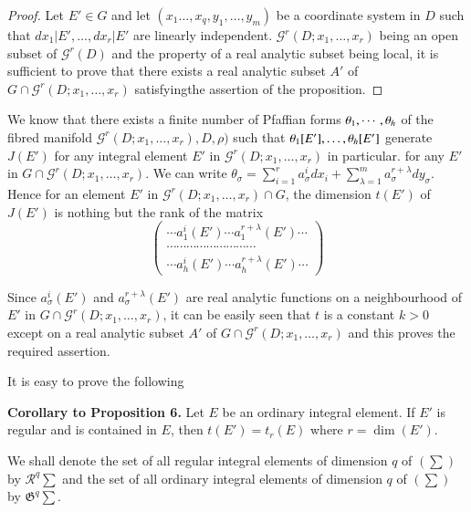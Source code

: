 \begin{proof}
  Let $E' \in G$ and let $(x_1 \ldots ,  x_q,  y_1 ,  \ldots ,  y_m)$
  be a coordinate system in $D$ such that $dx_1 \big | E' ,  \ldots ,
  dx_r \big | E'$ are linearly independent. \break $\mathscr{G}^r (D; x_1,
  \ldots ,  x_r)$ being an open subset of $\mathscr{G}^r(D)$ and the
  property of a real analytic subset being local,  it is sufficient to
  prove that there exists a real analytic subset $A'$ of $G \cap
  \mathscr{G}^r (D; x_1,  \ldots ,  x_r)$ satisfying\pageoriginale the assertion of
  the proposition. 
\end{proof}

We know that there exists a finite number of Pfaffian forms $\theta_1,
\cdots ,\break  \theta _h$ of the fibred manifold $ \mathscr{G}^r (D; x_1,
\ldots ,  x_r),  D,  \rho) $ such that $\theta_1 [E'],  \ldots ,\break
\theta_h  [E']$ generate $J(E')$ for any integral element $E'$ in
$\mathscr{G}^r (D; x_1, \ldots , x_r)$ in particular. for any $E'$ in $G
\cap  \mathscr{G}^r (D; x_1,  \ldots ,  x_r)$. We can write
$\theta_\sigma = \sum\limits_{i = 1}^r a^i_\sigma dx_i +
\sum\limits_{\lambda = 1}^m a^{r + \lambda}_\sigma dy_\sigma$. Hence for an
element $E'$ in $ \mathscr{G}^r (D; x_1,  \ldots ,  x_r) \cap G$,  the
dimension $t(E')$ of $J(E')$ is nothing but the rank of the matrix 
$$
\begin{pmatrix}
\cdots a^i_1 (E') \cdots a^{r + \lambda }_1 (E') \cdots\\
\cdots \cdots \cdots \cdots \cdots \cdots \cdots \cdots \cdots\\
\cdots a^i _h (E') \cdots a^{r + \lambda}_h (E') \cdots
\end{pmatrix}
$$

Since $a^i_\sigma (E')$ and $a^{r+ \lambda}_\sigma (E')$ are real
analytic functions on a neighbourhood of $E'$ in $G \cap \mathscr{G}^r
(D; x_1,  \ldots ,  x_r)$,  it can be easily seen that $t$ is a
constant $k > 0$ except on a real analytic subset $A'$ of $G \cap
\mathscr{G}^r (D; x_1,  \ldots ,  x_r)$ and this proves the required
assertion. 

It is easy to prove the following

\noindent
\textbf{Corollary to Proposition 6.} Let $E$ be an ordinary
integral element. If $E'$ is regular and is contained in $E$,  then
$t(E') = t_r (E)$ where $r = \dim (E')$. 

We shall denote the set of all regular integral elements of dimension
$q$ of $(\sum)$ by $\mathscr{R}^q \sum$ and the set of all ordinary
integral elements of dimension $q$ of $(\sum)$ by $\mathfrak{G}^q
\sum$. 

